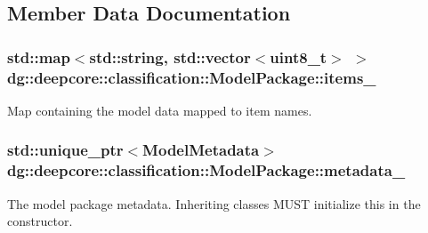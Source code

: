 \subsection{Member Data Documentation}
\subsubsection[{\texorpdfstring{items\+\_\+}{items_}}]{\setlength{\rightskip}{0pt plus 5cm}std\+::map$<$std\+::string, std\+::vector$<$uint8\+\_\+t$>$ $>$ dg\+::deepcore\+::classification\+::\+Model\+Package\+::items\+\_\+\hspace{0.3cm}{\ttfamily [protected]}}\hypertarget{classdg_1_1deepcore_1_1classification_1_1_model_package_a784e847b90280d4b73eee6fd79be4dcc}{}\label{classdg_1_1deepcore_1_1classification_1_1_model_package_a784e847b90280d4b73eee6fd79be4dcc}


Map containing the model data mapped to item names. 

\subsubsection[{\texorpdfstring{metadata\+\_\+}{metadata_}}]{\setlength{\rightskip}{0pt plus 5cm}std\+::unique\+\_\+ptr$<${\bf Model\+Metadata}$>$ dg\+::deepcore\+::classification\+::\+Model\+Package\+::metadata\+\_\+\hspace{0.3cm}{\ttfamily [protected]}}\hypertarget{classdg_1_1deepcore_1_1classification_1_1_model_package_a9c9ba155717330c95cdfb0f9ea28283d}{}\label{classdg_1_1deepcore_1_1classification_1_1_model_package_a9c9ba155717330c95cdfb0f9ea28283d}


The model package metadata. Inheriting classes M\+U\+ST initialize this in the constructor. 

